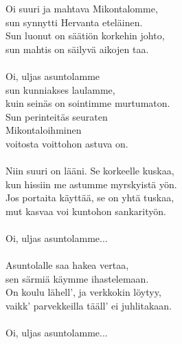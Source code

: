 
Oi suuri ja mahtava Mikontalomme, \\ sun synnytti Hervanta eteläinen. \\ Sun luonut on säätiön korkehin johto, \\ sun mahtis on säilyvä aikojen taa. \\ \hspace{10mm} \\ Oi, uljas asuntolamme \\ sun kunniakses laulamme, \\ kuin seinäs on sointimme murtumaton. \\ Sun perinteitäs seuraten \\ Mikontaloihminen \\ voitosta voittohon astuva on. \\ \hspace{10mm} \\ Niin suuri on lääni. Se korkeelle kuskaa, \\ kun hissiin me astumme myrskyistä yön. \\ Jos portaita käyttää, se on yhtä tuskaa, \\ mut kasvaa voi kuntohon sankarityön. \\ \hspace{10mm} \\ Oi, uljas asuntolamme... \\ \hspace{10mm} \\ Asuntolalle saa hakea vertaa, \\ sen särmiä käymme ihastelemaan. \\ On koulu lähell', ja verkkokin löytyy, \\ vaikk' parvekkeilla tääll' ei juhlitakaan. \\ \hspace{10mm} \\ Oi, uljas asuntolamme...
